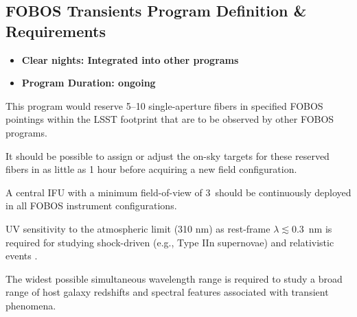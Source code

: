 \documentclass[11pt,a4paper,twoside,onecolumn,openany,final,oldfontcommands]{memoir}
\begin{document}
\subsection{FOBOS Transients Program Definition \& Requirements}

\medskip
\begin{itemize}[leftmargin=0.3in, itemsep=0pt]
	\item[] \textbf{Clear nights: Integrated into other programs}
	\item[] \textbf{Program Duration: ongoing}
\end{itemize}


\begin{programrequirement}
\reqitem This program would reserve 5--10 single-aperture fibers in specified FOBOS pointings within the LSST footprint that are to be observed by other FOBOS programs.  

\reqitem It should be possible to assign or adjust the on-sky targets for these reserved fibers in as little as 1 hour before acquiring a new field configuration.

\end{programrequirement}

\medskip
\begin{sciencerequirement}
\reqitem A central IFU with a minimum field-of-view of 3\arcsec\ should be continuously deployed in all FOBOS instrument configurations.

\reqitem UV sensitivity to the atmospheric limit (310 nm) as rest-frame $\lambda \lesssim 0.3$~nm is required for studying shock-driven (e.g., Type IIn supernovae) and relativistic events \citep[e.g., the atypically bright Type Ib supernova AT 2018cow;][]{margutti2019}.

\reqitem The widest possible simultaneous wavelength range is required to study a broad range of host galaxy redshifts and spectral features associated with transient phenomena.  
\end{sciencerequirement}


\end{document}
